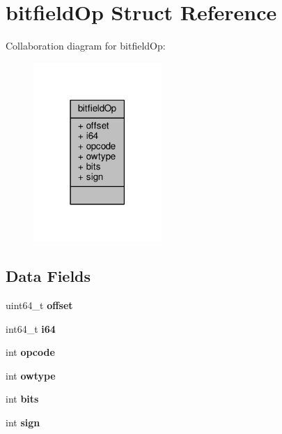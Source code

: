 \hypertarget{structbitfieldOp}{}\section{bitfield\+Op Struct Reference}
\label{structbitfieldOp}


Collaboration diagram for bitfield\+Op\+:\nopagebreak
\begin{figure}[H]
\begin{center}
\leavevmode
\includegraphics[width=138pt]{structbitfieldOp__coll__graph}
\end{center}
\end{figure}
\subsection*{Data Fields}
\begin{DoxyCompactItemize}
\item 
\mbox{\label{structbitfieldOp_aa0548e52311deb47a5bda61b5844f9e5}} 
uint64\+\_\+t {\bfseries offset}
\item 
\mbox{\label{structbitfieldOp_a4cd6c1beed5d37bed833f4302616bee7}} 
int64\+\_\+t {\bfseries i64}
\item 
\mbox{\label{structbitfieldOp_a6590f0d17ae13623625a80cc2784b253}} 
int {\bfseries opcode}
\item 
\mbox{\label{structbitfieldOp_a4a18ab35d1e0fe98ad934c4e2bb7cb06}} 
int {\bfseries owtype}
\item 
\mbox{\label{structbitfieldOp_a8f086789a4b5e2f2dfa2dc4bfd89d5ed}} 
int {\bfseries bits}
\item 
\mbox{\label{structbitfieldOp_a469bb961742ba367638b773b4910e1d3}} 
int {\bfseries sign}
\end{DoxyCompactItemize}


